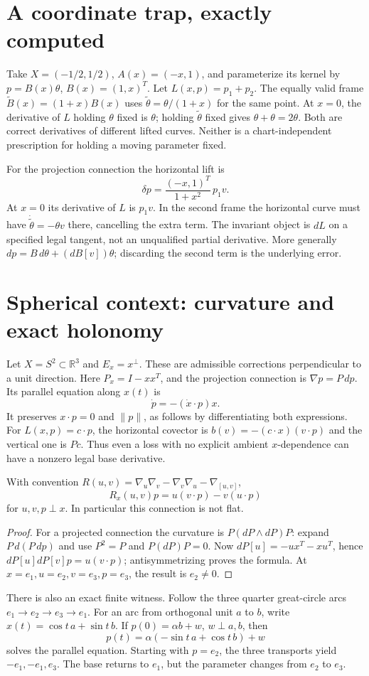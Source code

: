 \documentclass[11pt]{article}
\newcommand{\R}{\mathbb R}
\begin{document}
\section{A coordinate trap, exactly computed}
Take $X=(-1/2,1/2)$, $A(x)=(-x,1)$, and parameterize its kernel by $p=B(x)\theta$, $B(x)=(1,x)^T$. Let $L(x,p)=p_1+p_2$. The equally valid frame $\widetilde B(x)=(1+x)B(x)$ uses $\widetilde\theta=\theta/(1+x)$ for the same point. At $x=0$, the derivative of $L$ holding $\theta$ fixed is $\theta$; holding $\widetilde\theta$ fixed gives $\theta+\theta=2\theta$. Both are correct derivatives of different lifted curves. Neither is a chart-independent prescription for holding a moving parameter fixed.

For the projection connection the horizontal lift is
\[
 \delta p=\frac{(-x,1)^T}{1+x^2}\,p_1v.
\]
At $x=0$ its derivative of $L$ is $p_1v$. In the second frame the horizontal curve must have $\dot{\widetilde\theta}=-\theta v$ there, cancelling the extra term. The invariant object is $dL$ on a specified legal tangent, not an unqualified partial derivative. More generally $dp=B\,d\theta+(dB[v])\theta$; discarding the second term is the underlying error.

\section{Spherical context: curvature and exact holonomy}
Let $X=S^2\subset\R^3$ and $E_x=x^\perp$. These are admissible corrections perpendicular to a unit direction. Here $P_x=I-xx^T$, and the projection connection is $\nabla p=P\,dp$. Its parallel equation along $x(t)$ is
\[
 \dot p=-(\dot x\cdot p)x.
\]
It preserves $x\cdot p=0$ and $\|p\|$, as follows by differentiating both expressions. For $L(x,p)=c\cdot p$, the horizontal covector is $b(v)=-(c\cdot x)(v\cdot p)$ and the vertical one is $Pc$. Thus even a loss with no explicit ambient $x$-dependence can have a nonzero legal base derivative.
\begin{proposition}
With convention $R(u,v)=\nabla_u\nabla_v-\nabla_v\nabla_u-\nabla_{[u,v]}$,
\[
 R_x(u,v)p=u(v\cdot p)-v(u\cdot p)
\]
for $u,v,p\perp x$. In particular this connection is not flat.
\end{proposition}
\begin{proof}
For a projected connection the curvature is $P(dP\wedge dP)P$: expand $P\,d(P\,dp)$ and use $P^2=P$ and $P(dP)P=0$. Now $dP[u]=-ux^T-xu^T$, hence $dP[u]dP[v]p=u(v\cdot p)$; antisymmetrizing proves the formula. At $x=e_1,u=e_2,v=e_3,p=e_3$, the result is $e_2\ne0$.
\end{proof}
There is also an exact finite witness. Follow the three quarter great-circle arcs
$e_1\to e_2\to e_3\to e_1$. For an arc from orthogonal unit $a$ to $b$, write $x(t)=\cos t\,a+\sin t\,b$. If $p(0)=\alpha b+w$, $w\perp a,b$, then
\[
 p(t)=\alpha(-\sin t\,a+\cos t\,b)+w
\]
solves the parallel equation. Starting with $p=e_2$, the three transports yield $-e_1,-e_1,e_3$. The base returns to $e_1$, but the parameter changes from $e_2$ to $e_3$.
\end{document}
